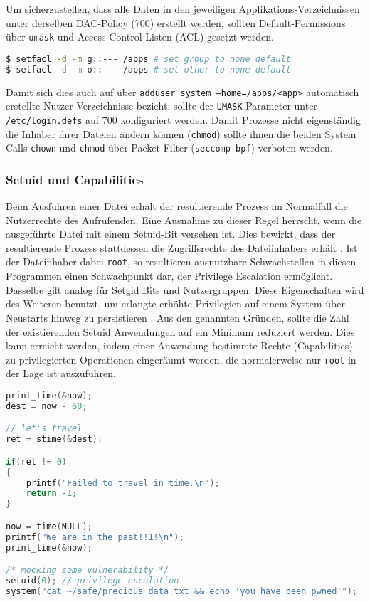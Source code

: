 Um sicherzustellen, dass alle Daten in den jeweiligen Applikations-Verzeichnissen unter derselben DAC-Policy (700) erstellt werden, sollten Default-Permissions über \texttt{umask} und Access Control Listen (ACL) gesetzt werden. 

\begin{lstlisting}[language=bash]
$ setfacl -d -m g::--- /apps # set group to none default
$ setfacl -d -m o::--- /apps # set other to none default
\end{lstlisting}

Damit sich dies auch auf über \texttt{adduser \-\-system --home=/apps/<app>} automatisch erstellte Nutzer-Verzeichnisse bezieht, sollte der \texttt{UMASK} Parameter unter \texttt{/etc/login.defs} auf 700 konfiguriert werden. Damit Prozesse nicht eigenständig die Inhaber ihrer Dateien ändern können (\texttt{chmod}) sollte ihnen die beiden System Calls \texttt{chown} und \texttt{chmod} über Packet-Filter (\texttt{seccomp-bpf}) verboten werden.



\subsubsection{Setuid und Capabilities}

Beim Ausführen einer Datei erhält der resultierende Prozess im Normalfall die Nutzerrechte des Aufrufenden. Eine Ausnahme zu dieser Regel herrscht, wenn die ausgeführte Datei mit einem Setuid-Bit versehen ist. Dies bewirkt, dass der resultierende Prozess stattdessen die Zugriffsrechte des Dateiinhabers erhält \cite{chmod}. Ist der Dateinhaber dabei \texttt{root}, so resultieren ausnutzbare Schwachstellen in diesen Programmen einen Schwachpunkt dar, der Privilege Escalation ermöglicht. Dasselbe gilt analog für Setgid
Bits und Nutzergruppen. Diese Eigenschaften wird des Weiteren benutzt, um erlangte erhöhte Privilegien auf einem System über Neustarts hinweg zu persistieren \cite{attack-setuid}. Aus den genannten Gründen, sollte die Zahl der existierenden Setuid Anwendungen auf ein Minimum reduziert werden. Dies kann erreicht werden, indem einer Anwendung bestimmte Rechte (Capabilities) zu privilegierten Operationen eingeräumt werden, die normalerweise nur \texttt{root} in der Lage ist
auszuführen. 

\begin{lstlisting}[language=c,label=lst:timetravel,caption={Zeitreise mittels \texttt{stime} und der Versuch die Privilegien auf \texttt{root} auszuweiten}]
print_time(&now);
dest = now - 60;

// let's travel
ret = stime(&dest);

if(ret != 0)
{
    printf("Failed to travel in time.\n");
    return -1;
}

now = time(NULL);
printf("We are in the past!!1!\n");
print_time(&now);

/* mocking some vulnerability */
setuid(0); // privilege escalation
system("cat ~/safe/precious_data.txt && echo 'you have been pwned'");
\end{lstlisting}

